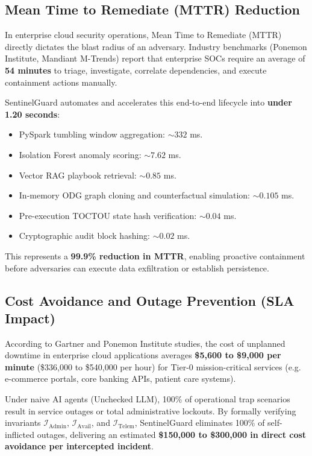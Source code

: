 \documentclass[12pt,a4paper]{report}
\begin{document}
\subsection{Mean Time to Remediate (MTTR) Reduction}
In enterprise cloud security operations, Mean Time to Remediate (MTTR) directly dictates the blast radius of an adversary. Industry benchmarks (Ponemon Institute, Mandiant M-Trends) report that enterprise SOCs require an average of \textbf{54 minutes} to triage, investigate, correlate dependencies, and execute containment actions manually.

SentinelGuard automates and accelerates this end-to-end lifecycle into \textbf{under 1.20 seconds}:
\begin{itemize}
    \item PySpark tumbling window aggregation: $\sim 332$ ms.
    \item Isolation Forest anomaly scoring: $\sim 7.62$ ms.
    \item Vector RAG playbook retrieval: $\sim 0.85$ ms.
    \item In-memory ODG graph cloning and counterfactual simulation: $\sim 0.105$ ms.
    \item Pre-execution TOCTOU state hash verification: $\sim 0.04$ ms.
    \item Cryptographic audit block hashing: $\sim 0.02$ ms.
\end{itemize}
This represents a \textbf{99.9\% reduction in MTTR}, enabling proactive containment before adversaries can execute data exfiltration or establish persistence.

\subsection{Cost Avoidance and Outage Prevention (SLA Impact)}
According to Gartner and Ponemon Institute studies, the cost of unplanned downtime in enterprise cloud applications averages \textbf{\$5,600 to \$9,000 per minute} (\$336,000 to \$540,000 per hour) for Tier-0 mission-critical services (e.g. e-commerce portals, core banking APIs, patient care systems).

Under naive AI agents (Unchecked LLM), 100\% of operational trap scenarios result in service outages or total administrative lockouts. By formally verifying invariants $\mathcal{I}_{\text{Admin}}$, $\mathcal{I}_{\text{Avail}}$, and $\mathcal{I}_{\text{Telem}}$, SentinelGuard eliminates 100\% of self-inflicted outages, delivering an estimated \textbf{\$150,000 to \$300,000 in direct cost avoidance per intercepted incident}.
\end{document}
